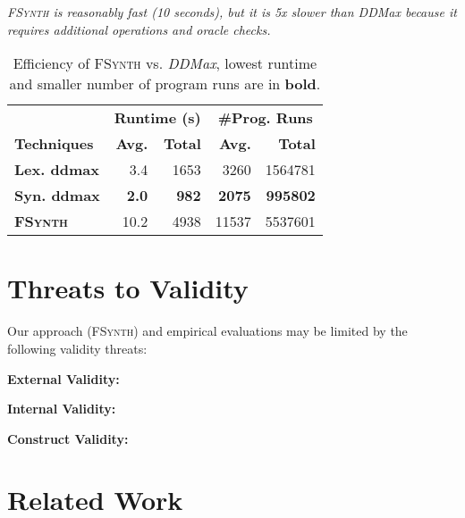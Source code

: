 \documentclass[sigconf,review,anonymous]{acmart}
\newenvironment{result}{\begin{framed}\centering\it}{\end{framed}}
\newcounter{todocounter}
\newcommand{\todo}[1]{\marginpar{$|$}\textcolor{red}{\stepcounter{todocounter}\footnote[\thetodocounter]{\textcolor{red}{\textbf{TODO }}\textit{#1}}}}
\renewcommand{\todo}[1]{}
\newcommand{\approach}{\textsc{FSynth}\xspace}
\newcommand{\ddmax}{\textit{DDMax}\xspace}
\begin{document}
\begin{result}
\approach is reasonably fast (10 seconds), but it 
is 5x slower than \ddmax because it requires
additional operations and oracle checks. 
\end{result}

\begin{table}[!tbp]\centering
\caption{Efficiency of \approach vs. \ddmax, lowest runtime and smaller number of program runs %
are in \textbf{bold}. %
}
\begin{tabular}{|l |  r  r | r  r |}
\hline
&  \multicolumn{2}{c|}{\textbf{Runtime (s)}} & \multicolumn{2}{c|}{\textbf{\#Prog. Runs}}  \\
\textbf{Techniques} %
&  \textbf{Avg.}  & \textbf{Total} & \textbf{Avg.}  & \textbf{Total} \\
\hline
\textbf{Lex. ddmax} & 3.4 & 1653 & 3260 & 1564781 \\
\textbf{Syn. ddmax} & \textbf{2.0} & \textbf{982}  & \textbf{2075}  & \textbf{995802}  \\
\hline
\textbf{\approach} &  10.2 & 4938  & 11537 & 5537601  \\
\hline
\end{tabular}
\label{tab:efficiency}
\end{table}


\section{Threats to Validity}
\label{sec:threats}

\todo{discuss threats to validity .... discuss issues like input synthesis (insertion), requires rich feedback: incorrect and incomplete input fragment}
Our approach (\approach) and empirical evaluations may be limited by the following validity threats:

\noindent
\textbf{External Validity:}

\noindent
\textbf{Internal Validity:}


\noindent
\textbf{Construct Validity:}


\section{Related Work}
\label{sec:related_work}
\end{document}

